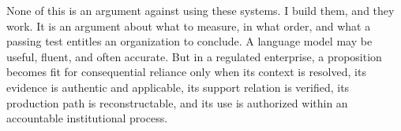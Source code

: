 None of this is an argument against using these systems. I build them, and they
work. It is an argument about what to measure, in what order, and what a passing
test entitles an organization to conclude. A language model may be useful, fluent,
and often accurate. But in a regulated enterprise, a proposition becomes fit for
consequential reliance only when its context is resolved, its evidence is authentic
and applicable, its support relation is verified, its production path is
reconstructable, and its use is authorized within an accountable institutional
process.
